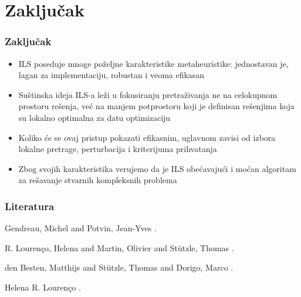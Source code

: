 \documentclass{beamer}
\begin{document}
\section{Zaključak}
\begin{frame}[fragile]\frametitle{Zaključak}
	\begin{itemize}
		\item ILS poseduje mnoge poželjne karakteristike metaheuristike: jednostavan je, lagan za implementaciju, robustan i veoma efikasan
		\item Suštinska ideja ILS-a leži u fokusiranju pretraživanja ne na celokupnom prostoru rešenja, već na manjem potprostoru koji je definisan rešenjima koja su lokalno optimalna za datu optimizaciju
		\item  Koliko će se ovaj pristup pokazati efikasnim, uglavnom zavisi od izbora lokalne pretrage, perturbacija i kriterijuma prihvatanja
		\item Zbog svojih karakteristika verujemo da je ILS obećavajući i moćan algoritam za rešavanje stvarnih kompleksnih problema
	\end{itemize}

\end{frame}

\begin{frame}[fragile]\frametitle{Literatura}
	\thispagestyle{empty}
  \begin{thebibliography}{10}
    \alert{Gendreau, Michel and Potvin, Jean-Yves}
    .
    
    \alert{R. Lourenço, Helena and Martin, Olivier and Stützle, Thomas}
    .

    \alert{den Besten,  Matthijs and Stützle, Thomas and Dorigo, Marco}
    .

    \alert{Helena R. Lourenço}
    .
    \end{thebibliography}
\end{frame}
\end{document}
